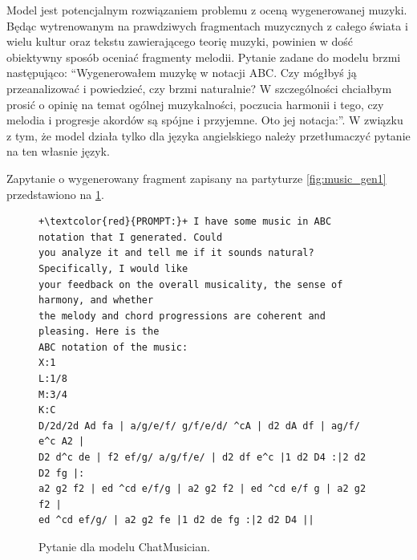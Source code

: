 \documentclass[data-science]{agh-wi} %
\begin{document}
Model jest potencjalnym rozwiązaniem problemu z oceną wygenerowanej muzyki. Będąc wytrenowanym na prawdziwych fragmentach muzycznych z całego świata i wielu kultur oraz tekstu zawierającego teorię muzyki, powinien w dość obiektywny sposób oceniać fragmenty melodii. Pytanie zadane do modelu brzmi następująco: ``Wygenerowałem muzykę w notacji ABC. Czy mógłbyś ją przeanalizować i powiedzieć, czy brzmi naturalnie? W szczególności chciałbym prosić o opinię na temat ogólnej muzykalności, poczucia harmonii i tego, czy melodia i progresje akordów są spójne i przyjemne. Oto jej notacja:''. W związku z tym, że model działa tylko dla języka angielskiego należy przetłumaczyć pytanie na ten własnie język.

Zapytanie o wygenerowany fragment zapisany na partyturze \ref*{fig:music_gen1} przedstawiono na \ref*{code:chat_prompt1}.

\begin{figure}[ht!]
    \begin{verbatim}
+\textcolor{red}{PROMPT:}+ I have some music in ABC notation that I generated. Could
you analyze it and tell me if it sounds natural? Specifically, I would like 
your feedback on the overall musicality, the sense of harmony, and whether 
the melody and chord progressions are coherent and pleasing. Here is the 
ABC notation of the music:
X:1
L:1/8
M:3/4
K:C
D/2d/2d Ad fa | a/g/e/f/ g/f/e/d/ ^cA | d2 dA df | ag/f/ e^c A2 | 
D2 d^c de | f2 ef/g/ a/g/f/e/ | d2 df e^c |1 d2 D4 :|2 d2 D2 fg |:
a2 g2 f2 | ed ^cd e/f/g | a2 g2 f2 | ed ^cd e/f g | a2 g2 f2 | 
ed ^cd ef/g/ | a2 g2 fe |1 d2 de fg :|2 d2 D4 ||
    \end{verbatim}
    \caption{Pytanie dla modelu ChatMusician.}\label{code:chat_prompt1}
\end{figure}
\end{document}
